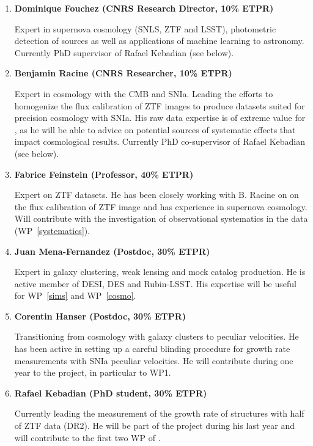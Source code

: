\begin{enumerate}
\item   \textbf{Dominique Fouchez (CNRS Research Director, 10\% ETPR)} 
        
Expert in supernova cosmology (SNLS, ZTF and LSST), 
photometric detection of sources as well 
as applications of machine learning to astronomy. 
Currently PhD supervisor of Rafael Kebadian (see below).
    
\item \textbf{Benjamin Racine (CNRS Researcher, 10\% ETPR)}

Expert in cosmology with the CMB and SNIa.  
Leading the efforts to homogenize the flux calibration of ZTF images 
to produce datasets suited for precision cosmology with SNIa. 
His raw data expertise is of extreme value for \projacro, as he will be able to advice on 
potential sources of systematic effects that impact cosmological results.  
Currently PhD co-supervisor of Rafael Kebadian (see below).

\item  \textbf{Fabrice Feinstein (Professor, 40\% ETPR)} 
    
Expert on ZTF datasets. He has been closely working with B. Racine on
on the flux calibration of
ZTF image and has experience in supernova cosmology. Will contribute 
with the investigation of observational systematics in the data (WP~\ref{systematics}). 

\item  \textbf{Juan Mena-Fernandez (Postdoc, 30\% ETPR)}

Expert in galaxy clustering, weak lensing and mock catalog production. 
He is active member of DESI, DES and Rubin-LSST. 
His expertise will be useful for WP~\ref{sims} and WP~\ref{cosmo}. 

\item \textbf{Corentin Hanser (Postdoc, 30\% ETPR)}
    
Transitioning from cosmology with galaxy clusters to peculiar velocities.  
He has been active in setting up a careful blinding procedure for 
growth rate measurements with SNIa peculiar velocities. 
He will contribute during one year to the project, in particular to WP1. 

\item \textbf{Rafael Kebadian (PhD student, 30\% ETPR)}
     
Currently leading the measurement of the growth rate of structures 
with half of ZTF data (DR2). He will be part of the
project during his last year and will contribute to the first 
two WP of \projacro.   
        

     \end{enumerate}


